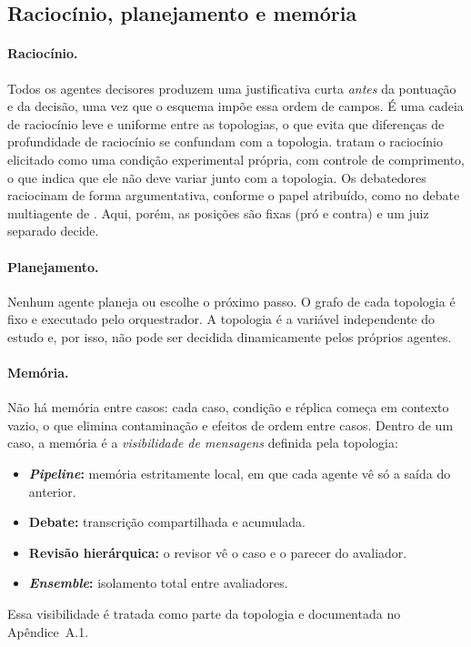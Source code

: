 \documentclass[12pt]{article}
\begin{document}
\subsection{Raciocínio, planejamento e memória}

\paragraph{Raciocínio.} Todos os agentes decisores produzem uma justificativa curta \emph{antes} da pontuação e da decisão, uma vez que o esquema impõe essa ordem de campos. É uma cadeia de raciocínio leve e uniforme entre as topologias, o que evita que diferenças de profundidade de raciocínio se confundam com a topologia. \citet{morla2026agentfairbench} tratam o raciocínio elicitado como uma condição experimental própria, com controle de comprimento, o que indica que ele não deve variar junto com a topologia. Os debatedores raciocinam de forma argumentativa, conforme o papel atribuído, como no debate multiagente de \citet{du2024debate}. Aqui, porém, as posições são fixas (pró e contra) e um juiz separado decide.

\paragraph{Planejamento.} Nenhum agente planeja ou escolhe o próximo passo. O grafo de cada topologia é fixo e executado pelo orquestrador. A topologia é a variável independente do estudo e, por isso, não pode ser decidida dinamicamente pelos próprios agentes.

\paragraph{Memória.} Não há memória entre casos: cada caso, condição e réplica começa em contexto vazio, o que elimina contaminação e efeitos de ordem entre casos. Dentro de um caso, a memória é a \emph{visibilidade de mensagens} definida pela topologia:
\begin{itemize}
    \item \textbf{\textit{Pipeline}:} memória estritamente local, em que cada agente vê só a saída do anterior.
    \item \textbf{Debate:} transcrição compartilhada e acumulada.
    \item \textbf{Revisão hierárquica:} o revisor vê o caso e o parecer do avaliador.
    \item \textbf{\textit{Ensemble}:} isolamento total entre avaliadores.
\end{itemize}
Essa visibilidade é tratada como parte da topologia e documentada no Apêndice~A.1.
\end{document}
